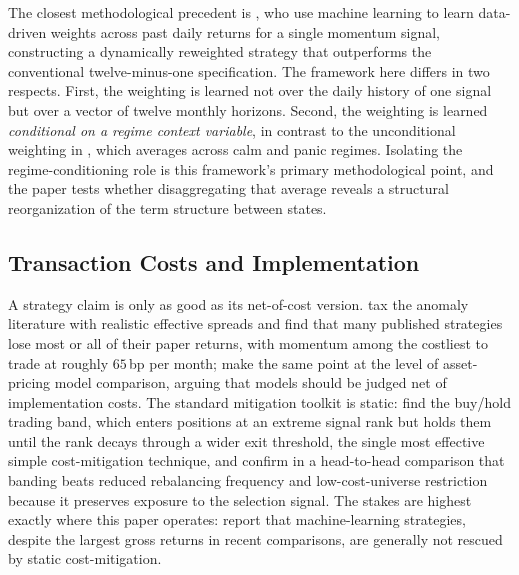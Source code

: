 The closest methodological precedent is \citet{BeckmeyerWiedemann2025}, who use machine learning to learn data-driven weights across past daily returns for a single momentum signal, constructing a dynamically reweighted strategy that outperforms the conventional twelve-minus-one specification. The framework here differs in two respects. First, the weighting is learned not over the daily history of one signal but over a vector of twelve monthly horizons. Second, the weighting is learned \emph{conditional on a regime context variable}, in contrast to the unconditional weighting in \citet{BeckmeyerWiedemann2025}, which averages across calm and panic regimes. Isolating the regime-conditioning role is this framework's primary methodological point, and the paper tests whether disaggregating that average reveals a structural reorganization of the term structure between states.

\subsection{Transaction Costs and Implementation}\label{sec:lit_costs}

A strategy claim is only as good as its net-of-cost version. \citet{NovyMarxVelikov2016} tax the anomaly literature with realistic effective spreads and find that many published strategies lose most or all of their paper returns, with momentum among the costliest to trade at roughly $65$\,bp per month; \citet{DetzelNovyMarxVelikov2023} make the same point at the level of asset-pricing model comparison, arguing that models should be judged net of implementation costs. The standard mitigation toolkit is static: \citet{NovyMarxVelikov2016} find the buy/hold trading band, which enters positions at an extreme signal rank but holds them until the rank decays through a wider exit threshold, the single most effective simple cost-mitigation technique, and \citet{NovyMarxVelikov2019} confirm in a head-to-head comparison that banding beats reduced rebalancing frequency and low-cost-universe restriction because it preserves exposure to the selection signal. The stakes are highest exactly where this paper operates: \citet{AzevedoHoegnerVelikov2024} report that machine-learning strategies, despite the largest gross returns in recent comparisons, are generally not rescued by static cost-mitigation.

